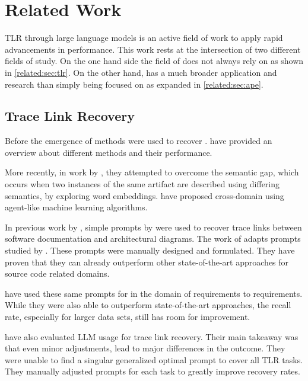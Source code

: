 \chapter{Related Work}
\Acl{TLR} through large language models is an active field of work to apply rapid advancements in \LLM performance.
This work rests at the intersection of two different fields of study.
On the one hand side the field of \TLR does not always rely on \LLMs as shown in \autoref{related:sec:tlr}.
On the other hand, \APE has a much broader application and research than simply being focused on \TLR as expanded in \autoref{related:sec:ape}.


\section{Trace Link Recovery}
\label{related:sec:tlr}

Before the emergence of \LLMs \IR methods were used to recover \TLs.
 have provided an overview about different \IR methods and their performance. 

More recently, in work by , they attempted to overcome the semantic gap, which occurs when two instances of the same artifact are described using differing semantics, by exploring word embeddings.
 have proposed cross-domain \TLR using agent-like machine learning algorithms. 



In previous work by , simple prompts by  were used to recover trace links between software documentation and architectural diagrams.
The work of \citeauthor{ewald2024RetrievalAugmentedLarge} adapts prompts studied by .
These prompts were manually designed and formulated.
They have proven that they can already outperform other state-of-the-art approaches for source code related \TLR domains.

 have used these same prompts for \TLR in the domain of requirements to requirements.
While they were also able to outperform state-of-the-art approaches, the recall rate, especially for larger data sets, still has room for improvement.

 have also evaluated LLM usage for trace link recovery.
Their main takeaway was that even minor adjustments,  lead to major differences in the outcome.
They were unable to find a singular generalized optimal prompt to cover all TLR tasks.
They manually adjusted prompts for each task to greatly improve recovery rates.

